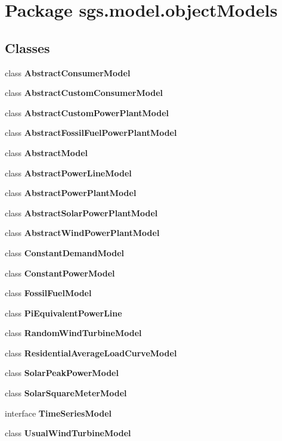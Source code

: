 \section{Package sgs.\-model.\-object\-Models}
\label{namespacesgs_1_1model_1_1object_models}
\subsection*{Classes}
\begin{DoxyCompactItemize}
\item 
class {\bf Abstract\-Consumer\-Model}
\item 
class {\bf Abstract\-Custom\-Consumer\-Model}
\item 
class {\bf Abstract\-Custom\-Power\-Plant\-Model}
\item 
class {\bf Abstract\-Fossil\-Fuel\-Power\-Plant\-Model}
\item 
class {\bf Abstract\-Model}
\item 
class {\bf Abstract\-Power\-Line\-Model}
\item 
class {\bf Abstract\-Power\-Plant\-Model}
\item 
class {\bf Abstract\-Solar\-Power\-Plant\-Model}
\item 
class {\bf Abstract\-Wind\-Power\-Plant\-Model}
\item 
class {\bf Constant\-Demand\-Model}
\item 
class {\bf Constant\-Power\-Model}
\item 
class {\bf Fossil\-Fuel\-Model}
\item 
class {\bf Pi\-Equivalent\-Power\-Line}
\item 
class {\bf Random\-Wind\-Turbine\-Model}
\item 
class {\bf Residential\-Average\-Load\-Curve\-Model}
\item 
class {\bf Solar\-Peak\-Power\-Model}
\item 
class {\bf Solar\-Square\-Meter\-Model}
\item 
interface {\bf Time\-Series\-Model}
\item 
class {\bf Usual\-Wind\-Turbine\-Model}
\end{DoxyCompactItemize}
